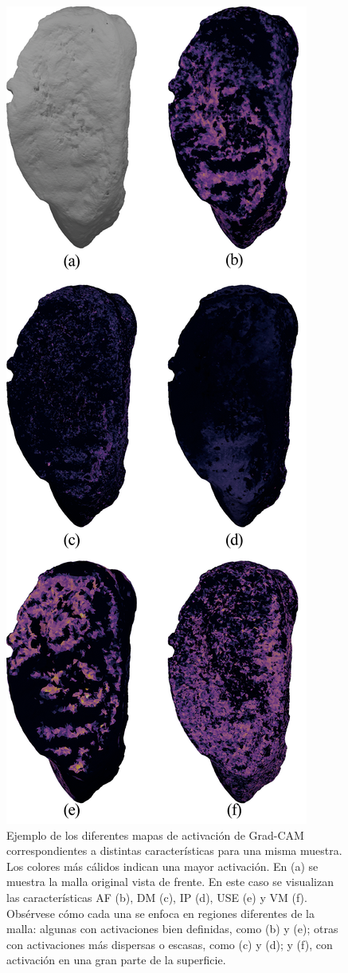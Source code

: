 \begin{figure}[p]
    \centering
    \includegraphics[width=0.5\linewidth]{figures/5_experiments/grad-cam-53-example.png}
    \caption[Ejemplo de mapas de activación de Grad-CAM correspondientes a distintas características para una misma muestra]{Ejemplo de los diferentes mapas de activación de Grad-CAM correspondientes a distintas características para una misma muestra. Los colores más cálidos indican una mayor activación. En (a) se muestra la malla original vista de frente. En este caso se visualizan las características AF (b), DM (c), IP (d), USE (e) y VM (f). Obsérvese cómo cada una se enfoca en regiones diferentes de la malla: algunas con activaciones bien definidas, como (b) y (e); otras con activaciones más dispersas o escasas, como (c) y (d); y (f), con activación en una gran parte de la superficie.}
    \label{fig5:grad_cam__diff_chars}
\end{figure}

